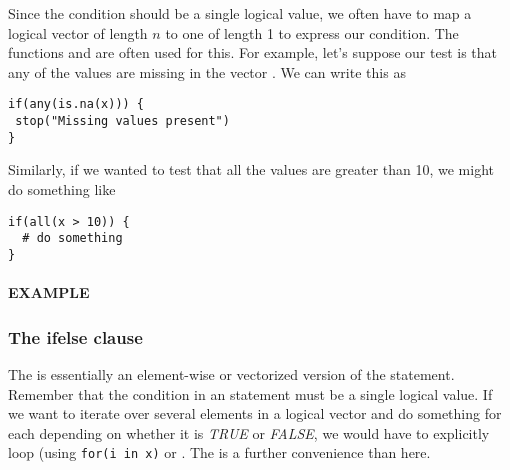 Since the condition should be a single logical value, we often have to
map a logical vector of length $n$ to one of length 1 to express our
condition. The functions  and  are often
used for this. For example, let's suppose our test is that any of the
values are missing in the vector . We can write this as
\begin{verbatim}
if(any(is.na(x))) {
 stop("Missing values present")
}
\end{verbatim}
Similarly, if we wanted to test that all the values are greater than
10, we might do something like
\begin{verbatim}
if(all(x > 10)) {
  # do something
}
\end{verbatim}

\paragraph{EXAMPLE}

\subsubsection{The ifelse clause}
The  is essentially an element-wise or vectorized
version of the  statement. Remember that the condition in
an  statement must be a single logical value. If we want
to iterate over several elements in a logical vector and do something
for each depending on whether it is \textsl{TRUE} or \textsl{FALSE},
we would have to explicitly loop (using \verb|for(i in x)| or
. The  is a further convenience
than  here.

